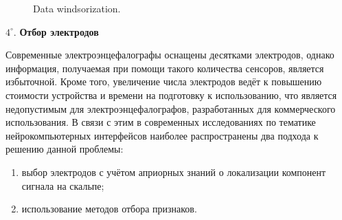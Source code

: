 \documentclass[12pt,fleqn]{article}
\begin{document}
	\begin{figure}[h!]
		\caption{Data windsorization.}
	\label{windsorization}
	\end{figure}

	\par $4^{\circ}.$ {\bf Отбор электродов}
	\par Современные электроэнцефалографы оснащены десятками электродов, однако информация, получаемая при помощи такого количества сенсоров, является избыточной. Кроме того, увеличение числа электродов ведёт к повышению стоимости устройства и времени на подготовку к использованию, что является недопустимым для электроэнцефалографов, разработанных для коммерческого использования. В связи с этим в современных исследованиях по тематике нейрокомпьютерных интерфейсов наиболее распространены два подхода к решению данной проблемы:
	\begin{enumerate}
	\item выбор электродов с учётом априорных знаний о локализации компонент сигнала на скальпе;
	\item использование методов отбора признаков.
	\end{enumerate}
\end{document}
